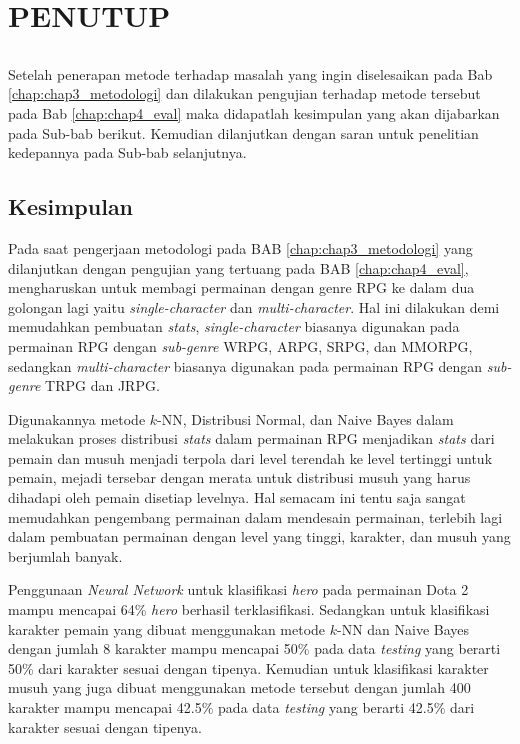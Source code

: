 \chapter{PENUTUP}
\label{sec:chap5_tutup}
\vspace{1ex}

\section*{}
Setelah penerapan metode terhadap masalah yang ingin diselesaikan pada Bab \ref{chap:chap3_metodologi} dan dilakukan pengujian terhadap metode tersebut pada Bab \ref*{chap:chap4_eval} maka didapatlah kesimpulan yang akan dijabarkan pada Sub-bab berikut. Kemudian dilanjutkan dengan saran untuk penelitian kedepannya pada Sub-bab selanjutnya.
\vspace{1ex}

\section{Kesimpulan}
\label{sec:sec4_kesimpulan}
\vspace{1ex}

Pada saat pengerjaan metodologi pada BAB \ref{chap:chap3_metodologi} yang dilanjutkan dengan pengujian yang tertuang pada BAB \ref{chap:chap4_eval}, mengharuskan untuk membagi permainan dengan genre RPG ke dalam dua golongan lagi yaitu \textit{single-character} dan \textit{multi-character}. Hal ini dilakukan demi memudahkan pembuatan \textit{stats}, \textit{single-character} biasanya digunakan pada permainan RPG dengan \textit{sub-genre} WRPG, ARPG, SRPG, dan MMORPG, sedangkan \textit{multi-character} biasanya digunakan pada permainan RPG dengan \textit{sub-genre} TRPG dan JRPG.
\vspace{1ex}

Digunakannya metode $k$-NN, Distribusi Normal, dan Naive Bayes dalam melakukan proses distribusi \textit{stats} dalam permainan RPG menjadikan \textit{stats} dari pemain dan musuh menjadi terpola dari level terendah ke level tertinggi untuk pemain, mejadi tersebar dengan merata untuk distribusi musuh yang harus dihadapi oleh pemain disetiap levelnya. Hal semacam ini tentu saja sangat memudahkan pengembang permainan dalam mendesain permainan, terlebih lagi dalam pembuatan permainan dengan level yang tinggi, karakter, dan musuh yang berjumlah banyak.
\vspace{1ex}

Penggunaan \textit{Neural Network} untuk klasifikasi \textit{hero} pada permainan Dota 2 mampu mencapai 64\% \textit{hero} berhasil terklasifikasi. Sedangkan untuk klasifikasi karakter pemain yang dibuat menggunakan metode $k$-NN dan Naive Bayes dengan jumlah 8 karakter mampu mencapai 50\% pada data \textit{testing} yang berarti 50\% dari karakter sesuai dengan tipenya. Kemudian untuk klasifikasi karakter musuh yang juga dibuat menggunakan metode tersebut dengan jumlah 400 karakter mampu mencapai 42.5\% pada data \textit{testing} yang berarti 42.5\% dari karakter sesuai dengan tipenya.
\vspace{1ex}

